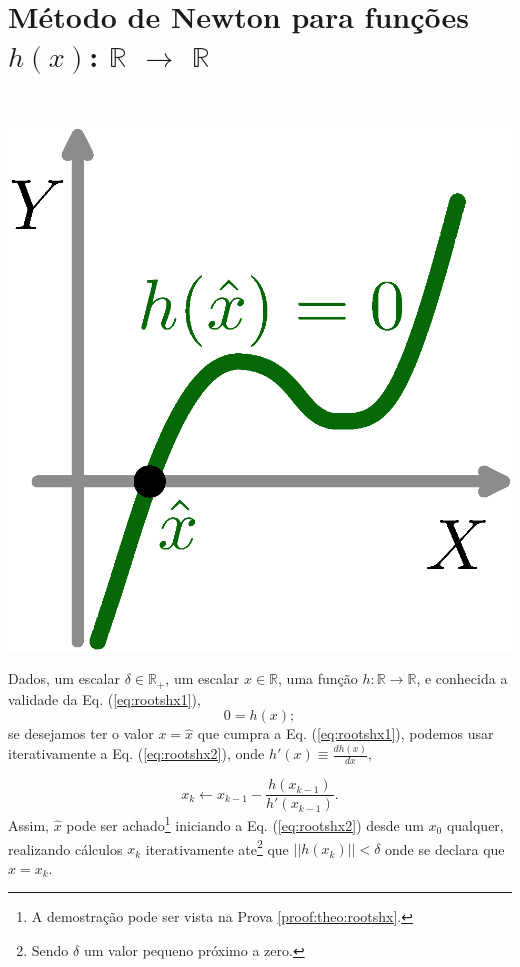 
\section{ Método de Newton para funções $h(x)$: $\mathbb{R}$ $\rightarrow$ $\mathbb{R}$ }

\begin{theorem}\label{theo:rootshx}
~\\
\begin{minipage}{0.20\textwidth}
\centering
\includegraphics[width=0.9\linewidth]{chapters/roots/roots1.eps} 
\end{minipage}
\begin{minipage}{0.8\textwidth}
Dados,
um escalar $\delta \in \mathbb{R}_+$, 
um escalar $x \in \mathbb{R}$, 
uma função $h:\mathbb{R} \rightarrow \mathbb{R}$, e 
conhecida a validade da Eq. (\ref{eq:rootshx1}),
\begin{equation}\label{eq:rootshx1}
0=h(x);
\end{equation}
se desejamos ter o valor $x=\hat{x}$ que cumpra a Eq. (\ref{eq:rootshx1}),
podemos usar iterativamente a Eq. (\ref{eq:rootshx2}),
onde  $h'(x)\equiv \frac{d h(x)}{d x}$,
\end{minipage}

\begin{equation}\label{eq:rootshx2}
x_{k} \leftarrow x_{k-1}-\frac{ h(x_{k-1})}{h'(x_{k-1})}.
\end{equation}
Assim, $\hat{x}$ pode ser achado\footnote{A 
demostração pode ser vista na Prova \ref{proof:theo:rootshx}.} 
iniciando a Eq. (\ref{eq:rootshx2}) desde um 
$x_{0}$ qualquer, realizando cálculos $x_{k}$ iterativamente  
ate\footnote{Sendo $\delta$ um valor pequeno próximo a zero.} que $||h(x_k)||<\delta$
onde se declara que $\hat{x}=x_k$.


\end{theorem}
